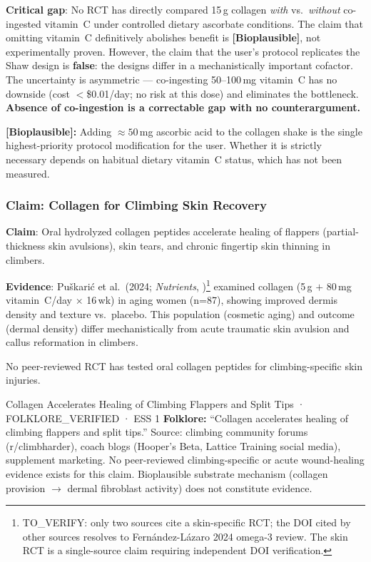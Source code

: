 \textbf{Critical gap}: No RCT has directly compared 15\,g collagen \textit{with} vs.\ \textit{without} co-ingested vitamin~C under controlled dietary ascorbate conditions. The claim that omitting vitamin~C definitively abolishes benefit is \textbf{[Bioplausible]}, not experimentally proven. However, the claim that the user's protocol replicates the Shaw design is \textbf{false}: the designs differ in a mechanistically important cofactor. The uncertainty is asymmetric --- co-ingesting 50--100\,mg vitamin~C has no downside (cost $<$\$0.01/day; no risk at this dose) and eliminates the bottleneck. \textbf{Absence of co-ingestion is a correctable gap with no counterargument.}

\textbf{[Bioplausible]:} Adding ${\approx}50$\,mg ascorbic acid to the collagen shake is the single highest-priority protocol modification for the user. Whether it is strictly necessary depends on habitual dietary vitamin~C status, which has not been measured.

\subsubsection{Claim: Collagen for Climbing Skin Recovery}

\textbf{Claim}: Oral hydrolyzed collagen peptides accelerate healing of flappers (partial-thickness skin avulsions), skin tears, and chronic fingertip skin thinning in climbers.

\textbf{Evidence}: Puškarić et al.\ (2024; \textit{Nutrients}, \cite{FAGE24})\footnote{TO\_VERIFY: only two sources cite a skin-specific RCT; the DOI cited by other sources resolves to Fernández-Lázaro 2024 omega-3 review. The skin RCT is a single-source claim requiring independent DOI verification.} examined collagen (5\,g $+$ 80\,mg vitamin~C/day $\times$ 16\,wk) in aging women (n=87), showing improved dermis density and texture vs.\ placebo. This population (cosmetic aging) and outcome (dermal density) differ mechanistically from acute traumatic skin avulsion and callus reformation in climbers.

No peer-reviewed RCT has tested oral collagen peptides for climbing-specific skin injuries.

\begin{folklorebox}{Collagen Accelerates Healing of Climbing Flappers and Split Tips · FOLKLORE\_VERIFIED · ESS 1}
\textbf{Folklore:} ``Collagen accelerates healing of climbing flappers and split tips.'' Source: climbing community forums (r/climbharder), coach blogs (Hooper's Beta, Lattice Training social media), supplement marketing. No peer-reviewed climbing-specific or acute wound-healing evidence exists for this claim. Bioplausible substrate mechanism (collagen provision $\to$ dermal fibroblast activity) does not constitute evidence.
\end{folklorebox}

